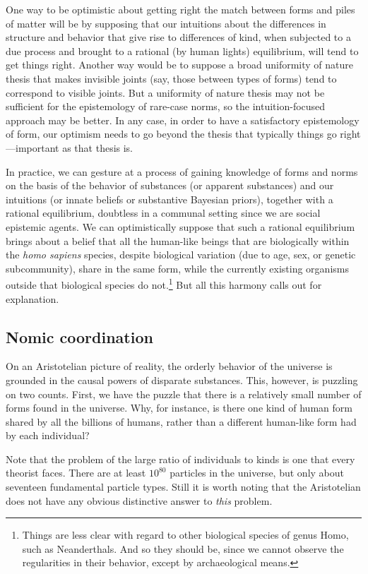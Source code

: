 One way to be optimistic about getting right the match between forms and piles of matter will be by supposing that 
our intuitions about the differences in structure and behavior that give rise to differences of kind, when subjected 
to a due process and brought to a rational (by human lights) equilibrium, will tend to get things right. Another way 
would be to suppose a broad uniformity of nature thesis that makes invisible joints (say, those between types of forms) tend to 
correspond to visible joints. But a uniformity of nature thesis may not be sufficient for the epistemology of rare-case 
norms, so the intuition-focused approach may be better. In any case, in order to have a satisfactory epistemology of form,
our optimism needs to go beyond the thesis that typically things go right---important as that thesis is.

In practice, we can gesture at a process of gaining knowledge of forms and norms on the basis of the behavior of 
substances (or apparent substances) and our intuitions (or innate beliefs or substantive Bayesian priors), together 
with a rational equilibrium, doubtless in a communal setting since we are social epistemic agents. We can optimistically
suppose that such a rational equilibrium brings about a belief that all the human-like beings that are biologically 
within the \textit{homo sapiens} species, despite biological variation (due to age, sex, or genetic subcommunity), share 
in the same form, while the currently existing organisms outside that biological species do not.\footnote{Things are less
clear with regard to other biological species of genus Homo, such as Neanderthals. And so they should be, since we cannot
observe the regularities in their behavior, except by archaeological means.} But all this harmony calls out
for explanation.


\subsection{Nomic coordination}
On an Aristotelian picture of reality, the orderly behavior of the universe is grounded in the causal powers of 
disparate substances. This, however, is puzzling on two counts. First, we have the puzzle that there is a 
relatively small number of forms found in the universe. Why, for instance, is there one kind of human form shared by all 
the billions of humans, rather than a different human-like form had by each individual? 

Note that the problem of the large ratio of individuals to kinds is one that every theorist faces. There are at least $10^{80}$ 
particles in the universe, but only about seventeen fundamental particle types. Still it is worth noting that the 
Aristotelian does not have any obvious distinctive answer to \textit{this} problem. 

